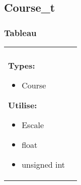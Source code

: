 \documentclass[a4paper, 11pt, oneside]{article}
\begin{document}
		\footnotetext{\textcolor{red}{Nom des opérations interne}}
		\footnotetext{\textcolor{green}{Arguments}}
		\footnotetext{\textcolor{blue}{Types de retour}}
		\footnotetext{\textcolor{magenta}{Nom des opérations d'observation}}


	\subsection{Course\_t}
		\subsubsection{Tableau}
			\begin{tabular}{|p{17cm}|c}
				\hline
				\\

				\textbf{Types:}
					\begin{itemize}
						\item[] Course
					\end{itemize}

				\textbf{Utilise:}
					\begin{itemize}
						\item[] Escale
						\item[] float
						\item[] unsigned int
					\end{itemize}


\end{tabular}
\end{document}
